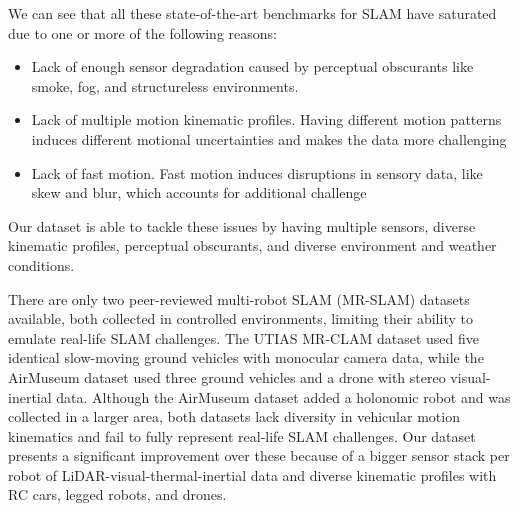 \documentclass[10pt,twocolumn,letterpaper]{article}
\begin{document}
We can see that all these state-of-the-art benchmarks for SLAM have saturated due to one or more of the following reasons:

\begin{itemize}[noitemsep,topsep=0pt]
    \item Lack of enough sensor degradation caused by perceptual obscurants like smoke, fog, and structureless environments.
    \item Lack of multiple motion kinematic profiles. Having different motion patterns induces different motional uncertainties and makes the data more challenging
    \item Lack of fast motion. Fast motion induces disruptions in sensory data, like skew and blur, which accounts for additional challenge
\end{itemize}

Our dataset is able to tackle these issues by having multiple sensors, diverse kinematic profiles, perceptual obscurants, and diverse environment and weather conditions.

There are only two peer-reviewed multi-robot SLAM (MR-SLAM) datasets available, both collected in controlled environments, limiting their ability to emulate real-life SLAM challenges. The UTIAS MR-CLAM dataset\cite{utias} used five identical slow-moving ground vehicles with monocular camera data, while the AirMuseum dataset\cite{air_museum} used three ground vehicles and a drone with stereo visual-inertial data. Although the AirMuseum dataset added a holonomic robot and was collected in a larger area, both datasets lack diversity in vehicular motion kinematics and fail to fully represent real-life SLAM challenges. Our dataset presents a significant improvement over these because of a bigger sensor stack per robot of LiDAR-visual-thermal-inertial data and diverse kinematic profiles with RC cars, legged robots, and drones.




\end{document}
